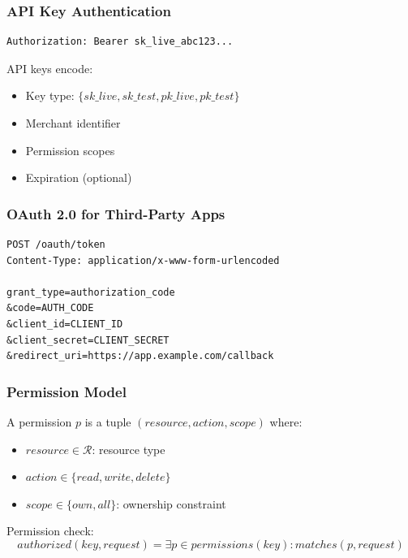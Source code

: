 \subsubsection{API Key Authentication}

\begin{lstlisting}[caption=API Key Header]
Authorization: Bearer sk_live_abc123...
\end{lstlisting}

API keys encode:
\begin{itemize}
    \item Key type: $\{sk\_live, sk\_test, pk\_live, pk\_test\}$
    \item Merchant identifier
    \item Permission scopes
    \item Expiration (optional)
\end{itemize}

\subsubsection{OAuth 2.0 for Third-Party Apps}

\begin{lstlisting}[caption=OAuth Token Request]
POST /oauth/token
Content-Type: application/x-www-form-urlencoded

grant_type=authorization_code
&code=AUTH_CODE
&client_id=CLIENT_ID
&client_secret=CLIENT_SECRET
&redirect_uri=https://app.example.com/callback
\end{lstlisting}

\subsubsection{Permission Model}

\begin{definition}
A permission $p$ is a tuple $(resource, action, scope)$ where:
\begin{itemize}
    \item $resource \in \mathcal{R}$: resource type
    \item $action \in \{read, write, delete\}$
    \item $scope \in \{own, all\}$: ownership constraint
\end{itemize}
\end{definition}

Permission check:
\begin{equation}
authorized(key, request) = \exists p \in permissions(key) : matches(p, request)
\end{equation}

